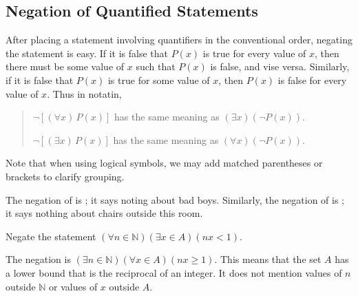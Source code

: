 \subsection{Negation of Quantified Statements}

After placing a statement involving quantifiers in the conventional order,
negating the statement is easy.
If it is false that $P(x)$ is true for every value of $x$,
then there must be some value of $x$ such that $P(x)$ is false,
and vise versa.
Similarly, if it is false that $P(x)$ is true for some value of $x$,
then $P(x)$ is false for every value of $x$.
Thus in notatin,
\begin{quotation}
$\neg[(\forall x)\,P(x)]$ has the same meaning as $(\exists x)(\neg P(x))$.

$\neg[(\exists x)\,P(x)]$ has the same meaning as $(\forall x)(\neg P(x))$.
\end{quotation}
Note that when using logical symbols, we may add matched parentheses or brackets to clarify grouping.


\begin{eg}
The negation of  is ;
it says noting about bad boys.
Similarly, the negation of  is ;
it says nothing about chairs outside this room.
\end{eg}



\begin{eg}
Negate the statement $(\forall n\in\mathbb{N})(\exists x\in A)(nx<1)$.
\end{eg}
\begin{sol}
The negation is $(\exists n\in\mathbb{N})(\forall x\in A)(nx\ge 1)$.
This means that the set $A$ has a lower bound that is the reciprocal of an integer.
It does not mention values of $n$ outside $\mathbb{N}$ or values of $x$ outside $A$.
\end{sol}


